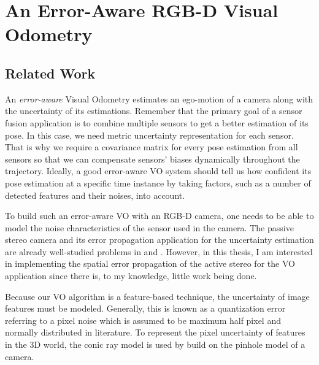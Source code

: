 \documentclass[a4paper]{report}
\numberwithin{figure}{section}
\begin{document}
\chapter{An Error-Aware RGB-D Visual Odometry} \label{cp_covo}

\section{Related Work} \label{sc_error_aware_visual_odometry_related_works}

An \textit{error-aware} Visual Odometry estimates an ego-motion of a camera
along with the uncertainty of its estimations.  Remember that the primary goal
of a sensor fusion application is to combine multiple sensors to get a better
estimation of its pose.  In this case, we need metric uncertainty
representation for each sensor.  That is why we require a covariance matrix for
every pose estimation from all sensors so that we can compensate sensors'
biases dynamically throughout the trajectory.  Ideally, a good error-aware VO
system should tell us how confident its pose estimation at a specific time
instance by taking factors, such as a number of detected features and their
noises, into account.

To build such an error-aware VO with an RGB-D camera, one needs to be able to
model the noise characteristics of the sensor used in the camera. The passive
stereo camera and its error propagation application for the uncertainty
estimation are already well-studied problems in \parencite{Leo2011} and
\parencite{Miura1993AnUM}.
However, in this thesis, I am interested in implementing the spatial error
propagation of the active stereo for the VO application since there is, to my
knowledge, little work being done.

Because our VO algorithm is a feature-based technique, the uncertainty of image
features must be modeled.  Generally, this is known as a quantization error
referring to a pixel noise \parencite{RichardHartley2003} which is assumed to 
be
maximum half pixel and normally distributed in literature.  To represent the
pixel uncertainty of features in the 3D world, the conic ray model
\parencite{Sola2007a} is used by build on the pinhole model of a camera.
\end{document}
